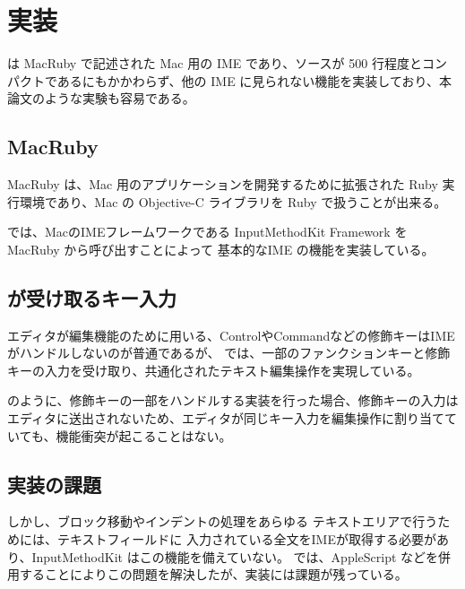 \section{実装}
{\system} は MacRuby で記述された Mac 用の IME であり、ソースが 500 行程度とコンパクトであるにもかかわらず、他の IME に見られない機能を実装しており、本論文のような実験も容易である。

\subsection{MacRuby}

MacRuby は、Mac 用のアプリケーションを開発するために拡張された Ruby 実
行環境であり、Mac の Objective-C ライブラリを Ruby で扱うことが出来る。

{\system} では、MacのIMEフレームワークである
InputMethodKit Framework を MacRuby から呼び出すことによって
基本的なIME の機能を実装している。

\subsection{{\system}が受け取るキー入力}
エディタが編集機能のために用いる、ControlやCommandなどの修飾キーはIMEがハンドルしないのが普通であるが、
{\system}では、一部のファンクションキーと修飾キーの入力を受け取り、共通化されたテキスト編集操作を実現している。

{\system} のように、修飾キーの一部をハンドルする実装を行った場合、修飾キーの入力はエディタに送出されないため、エディタが同じキー入力を編集操作に割り当てていても、機能衝突が起こることはない。

\subsection{実装の課題}
しかし、ブロック移動やインデントの処理をあらゆる テキストエリアで行うためには、テキストフィールドに 入力されている全文をIMEが取得する必要があり、InputMethodKit はこの機能を備えていない。{\system} では、AppleScript などを併用することによりこの問題を解決したが、実装には課題が残っている。
